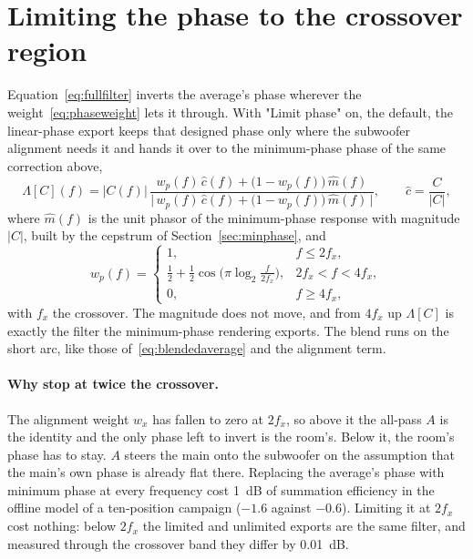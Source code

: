 \section{Limiting the phase to the crossover region}\label{sec:thphaselimit}
Equation~\eqref{eq:fullfilter} inverts the average's phase wherever the weight~\eqref{eq:phaseweight} lets it through. With "Limit phase" on, the default, the linear-phase export keeps that designed phase only where the subwoofer alignment needs it and hands it over to the minimum-phase phase of the same correction above,
\begin{equation}
  \Lambda[C](f) = |C(f)|\,
     \frac{w_p(f)\,\hat c(f) + \bigl(1-w_p(f)\bigr)\,\hat m(f)}
          {\bigl|\,w_p(f)\,\hat c(f) + \bigl(1-w_p(f)\bigr)\,\hat m(f)\,\bigr|},
  \qquad \hat c = \frac{C}{|C|},
  \label{eq:phaselimit}
\end{equation}
where $\hat m(f)$ is the unit phasor of the minimum-phase response with magnitude $|C|$, built by the cepstrum of Section~\ref{sec:minphase}, and
\begin{equation}
  w_p(f) = \begin{cases}
             1, & f \le 2f_x,\\[2pt]
             \tfrac12 + \tfrac12\cos\!\bigl(\pi\log_2\tfrac{f}{2f_x}\bigr), & 2f_x < f < 4f_x,\\[2pt]
             0, & f \ge 4f_x,
           \end{cases}
  \label{eq:phaselimitweight}
\end{equation}
with $f_x$ the crossover. The magnitude does not move, and from $4f_x$ up $\Lambda[C]$ is exactly the filter the minimum-phase rendering exports. The blend runs on the short arc, like those of~\eqref{eq:blendedaverage} and the alignment term.

\paragraph{Why stop at twice the crossover.} The alignment weight $w_x$ has fallen to zero at $2f_x$, so above it the all-pass $A$ is the identity and the only phase left to invert is the room's. Below it, the room's phase has to stay. $A$ steers the main onto the subwoofer on the assumption that the main's own phase is already flat there. Replacing the average's phase with minimum phase at every frequency cost \SI{1}{\dB} of summation efficiency in the offline model of a ten-position campaign ($-1.6$ against $-0.6$). Limiting it at $2f_x$ cost nothing: below $2f_x$ the limited and unlimited exports are the same filter, and measured through the crossover band they differ by \SI{0.01}{\dB}.

